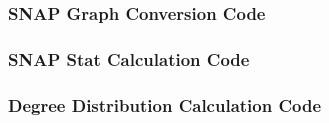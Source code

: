 \documentclass[pdftex,11pt,a4paper,twocolumn]{scrartcl}
\begin{document}
\pagebreak

\subsubsection{SNAP Graph Conversion Code}
\label{sec:readData}


\pagebreak

\subsubsection{SNAP Stat Calculation Code}
\label{sec:calcStats}


\pagebreak

\subsubsection{Degree Distribution Calculation Code}
\label{sec:degreeDistros}


\pagebreak
\end{document}
